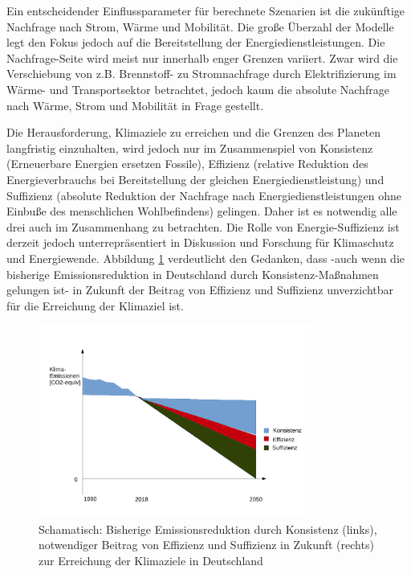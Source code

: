 \documentclass[a4paper,11pt,twoside]{scrartcl}
\begin{document}
Ein entscheidender Einflussparameter für berechnete Szenarien ist die zukünftige Nachfrage nach Strom, Wärme und Mobilität. Die große Überzahl der Modelle legt den Fokus jedoch auf die Bereitstellung der Energiedienstleistungen. Die Nachfrage-Seite wird meist nur innerhalb enger Grenzen variiert. Zwar wird die Verschiebung von z.B. Brennstoff- zu Stromnachfrage durch Elektrifizierung im Wärme- und Transportsektor betrachtet, jedoch kaum die absolute Nachfrage nach Wärme, Strom und Mobilität in Frage gestellt.

Die Herausforderung, Klimaziele zu erreichen und die Grenzen des Planeten langfristig einzuhalten, wird jedoch nur im Zusammenspiel von Konsistenz (Erneuerbare Energien ersetzen Fossile), Effizienz (relative Reduktion des Energieverbrauchs bei Bereitstellung der gleichen Energiedienstleistung) und Suffizienz (absolute Reduktion der Nachfrage nach Energiedienstleistungen ohne Einbuße des menschlichen Wohlbefindens) gelingen. Daher ist es notwendig alle drei auch im Zusammenhang zu betrachten. Die Rolle von Energie-Suffizienz ist derzeit jedoch unterrepräsentiert in Diskussion und Forschung für Klimaschutz und Energiewende. Abbildung \ref{fig:zusammenspiel} verdeutlicht den Gedanken, dass -auch wenn die bisherige Emissionsreduktion in Deutschland durch Konsistenz-Maßnahmen gelungen ist- in Zukunft der Beitrag von Effizienz und Suffizienz unverzichtbar für die Erreichung der Klimaziel ist.

\begin{figure}[!h]
    \centering
    \includegraphics[width=0.8\textwidth]{figures/Zusammenspiel.pdf}
    \caption{Schamatisch: Bisherige Emissionsreduktion durch Konsistenz (links), notwendiger Beitrag von Effizienz und Suffizienz in Zukunft (rechts) zur Erreichung der Klimaziele in Deutschland}
    \label{fig:zusammenspiel}
\end{figure}
\end{document}
